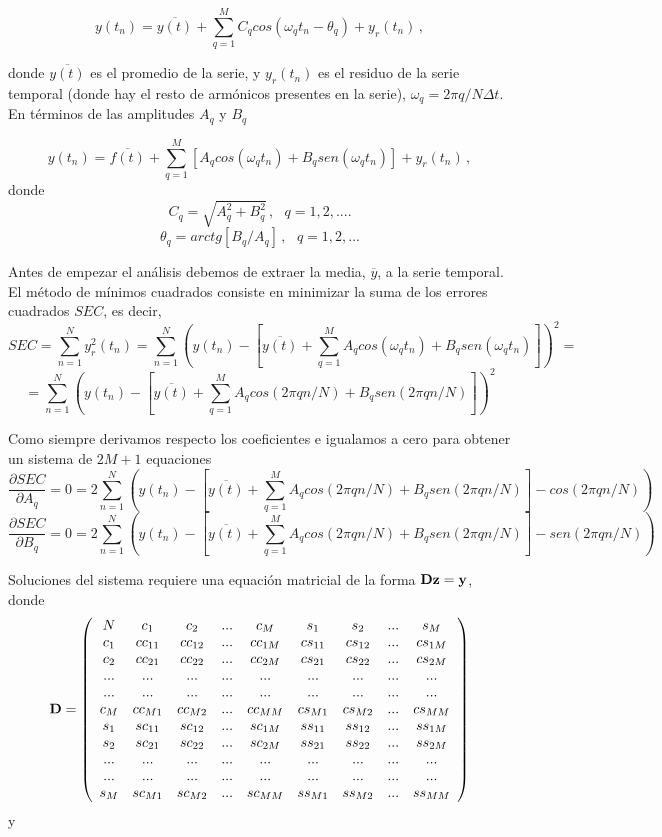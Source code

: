 \documentclass[
]{agujournal2019}
\begin{document}
\[y(t_n) = \overline{y(t)} + \sum\limits^{M}_{q=1}C_q cos(\omega_q t_n -\theta_q)+y_r(t_n)\,,\]

donde \(\overline{y(t)}\) es el promedio de la serie, y \(y_r(t_n)\) es
el residuo de la serie temporal (donde hay el resto de armónicos
presentes en la serie), \(\omega_q=2\pi q/N\Delta t\). En términos de
las amplitudes \(A_q\) y \(B_q\)

\[y(t_n) = \overline{f(t)} + \sum\limits^{M}_{q=1}[A_q cos(\omega_q t_n)+B_q sen(\omega_q t_n)] +y_r(t_n)\,,\]
donde \[C_q=\sqrt{A_q^2+B_q^2}\,,\,\,\,\,q=1,2,....\]
\[\theta_q=arctg[B_q/A_q]\,,\,\,\,\,q=1,2,...\]

Antes de empezar el análisis debemos de extraer la media,
\(\overline{y}\), a la serie temporal. El método de mínimos cuadrados
consiste en minimizar la suma de los errores cuadrados \(SEC\), es
decir,
\[SEC= \sum\limits^N_{n=1} y_r^2(t_n) = \sum\limits^N_{n=1}  \left( y(t_n) - \left[ \overline{y(t)} +
 \sum\limits^{M}_{q=1} A_q cos(\omega_q t_n)+B_q sen(\omega_q t_n) \right] \right)^2 =\]
\[=\sum\limits^N_{n=1}  \left(y(t_n) - \left[ \overline{y(t)} +
\sum\limits^{M}_{q=1} A_q cos(2\pi q n/ N)+B_q sen(2\pi q n/ N) \right] \right)^2\]

Como siempre derivamos respecto los coeficientes e igualamos a cero para
obtener un sistema de \(2M+1\) equaciones
\[\frac{\partial{SEC}}{\partial{A_q}}=0=2\sum\limits^N_{n=1} \left(y(t_n) - \left[ \overline{y(t)} +
\sum\limits^{M}_{q=1} A_q cos(2\pi q n/ N)+B_q sen(2\pi q n/ N) \right]-cos(2\pi q n/ N) \right)\]
\[\frac{\partial{SEC}}{\partial{B_q}}=0=2\sum\limits^N_{n=1} \left(y(t_n) - \left[ \overline{y(t)} +
\sum\limits^{M}_{q=1} A_q cos(2\pi q n/ N)+B_q sen(2\pi q n/ N) \right]-sen(2\pi q n/ N) \right)\]

Soluciones del sistema requiere una equación matricial de la forma
\({\textbf D}{\textbf z}={\textbf y}\), donde
\[{\textbf D}=\left( \begin{array}{cccccccccccccc}
  N & c_1 & c_2 & ... & c_M & s_1 & s_2 & ... & s_M \\
  c_1 & cc_{11} & cc_{12} & ... & cc_{1M} & cs_{11} & cs_{12} & ... & cs_{1M} \\
  c_2 & cc_{21} & cc_{22} & ... & cc_{2M} & cs_{21} & cs_{22} & ... & cs_{2M} \\
  ... & ... & ... & ... & ... & ... & ... & ... & ... \\
  ... & ... & ... & ... & ... & ... & ... & ... & ... \\
  c_M & cc_{M1} & cc_{M2} & ... & cc_{MM} & cs_{M1} & cs_{M2} & ... & cs_{MM} \\
  s_1 & sc_{11} & sc_{12} & ... & sc_{1M} & ss_{11} & ss_{12} & ... & ss_{1M} \\
  s_2 & sc_{21} & sc_{22} & ... & sc_{2M} & ss_{21} & ss_{22} & ... & ss_{2M} \\
  ... & ... & ... & ... & ... & ... & ... & ... & ... \\
  ... & ... & ... & ... & ... & ... & ... & ... & ... \\
  s_M & sc_{M1} & sc_{M2} & ... & sc_{MM} & ss_{M1} & ss_{M2} & ... & ss_{MM} \\
      \end{array} \right)\] y
\end{document}
